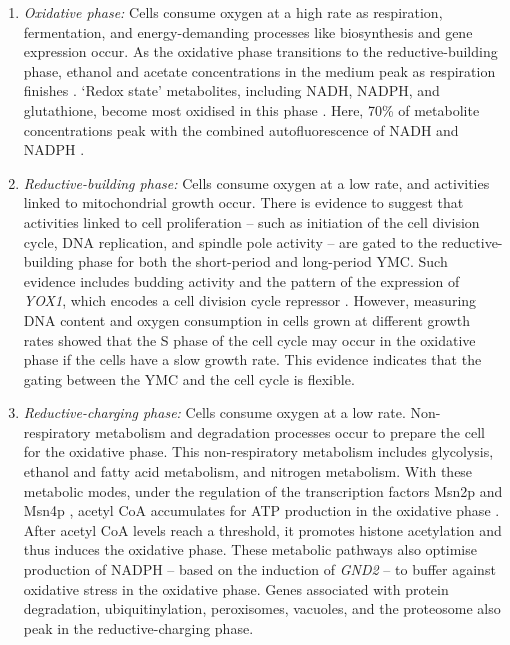 \begin{enumerate}
  \item \emph{Oxidative phase:} Cells consume oxygen at a high rate as respiration, fermentation, and energy-demanding processes like biosynthesis and gene expression occur.
    As the oxidative phase transitions to the reductive-building phase, ethanol and acetate concentrations in the medium peak as respiration finishes \citep{tu_logic_2005}.
    `Redox state' metabolites, including NADH, NADPH, and glutathione, become most oxidised in this phase \citep{lloyd_ultradian_2005}.
Here, 70\% of metabolite concentrations peak with the combined autofluorescence of NADH and NADPH \citep{murray_regulation_2007}.
\item \emph{Reductive-building phase:} Cells consume oxygen at a low rate, and activities linked to mitochondrial growth occur.
  There is evidence to suggest that activities linked to cell proliferation -- such as initiation of the cell division cycle, DNA replication, and spindle pole activity -- are gated to the reductive-building phase for both the short-period and long-period YMC.
  Such evidence includes budding activity and the pattern of the expression of \emph{YOX1}, which encodes a cell division cycle repressor \citep{tu_logic_2005}.
  However, measuring DNA content and oxygen consumption in cells grown at different growth rates \citep{slavov_coupling_2011} showed that the S phase of the cell cycle may occur in the oxidative phase if the cells have a slow growth rate.
  This evidence indicates that the gating between the YMC and the cell cycle is flexible.
\item \emph{Reductive-charging phase:} Cells consume oxygen at a low rate.
  Non-respiratory metabolism and degradation processes occur to prepare the cell for the oxidative phase.
  This non-respiratory metabolism includes glycolysis, ethanol and fatty acid metabolism, and nitrogen metabolism.
  With these metabolic modes, under the regulation of the transcription factors Msn2p and Msn4p \citep{kuang_msn2/4_2017}, acetyl CoA accumulates for ATP production in the oxidative phase \citep{tu_logic_2005}.
After acetyl CoA levels reach a threshold, it promotes histone acetylation and thus induces the oxidative phase.
These metabolic pathways also optimise production of NADPH -- based on the induction of \emph{GND2} -- to buffer against oxidative stress in the oxidative phase.
Genes associated with protein degradation, ubiquitinylation, peroxisomes, vacuoles, and the proteosome also peak in the reductive-charging phase.
\end{enumerate}

